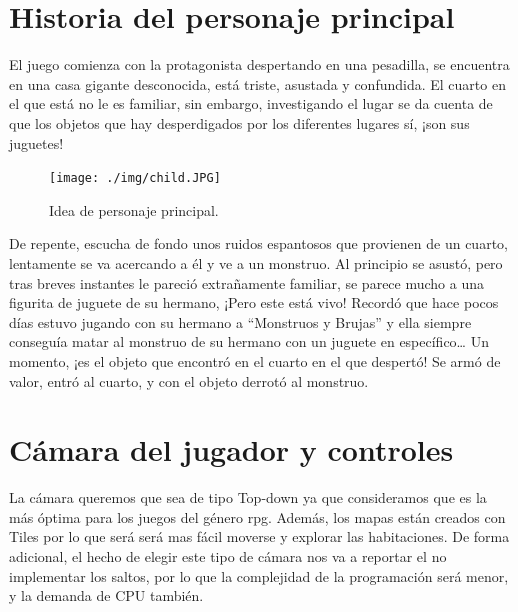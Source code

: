 \newpage

\section{Historia del personaje principal}

El juego comienza con la protagonista despertando en una pesadilla, se encuentra en una casa gigante desconocida, está triste, asustada y confundida. El cuarto en el que está no le es familiar, sin embargo, investigando el lugar se da cuenta de que los objetos que hay desperdigados por los diferentes lugares sí, ¡son sus juguetes!

\begin{figure}[!htb]
  \centering
    \texttt{[image: ./img/child.JPG]}
    \caption{Idea de personaje principal.}
  \label{fig:yo}
\end{figure}
\newline
De repente, escucha de fondo unos ruidos espantosos que provienen de un cuarto, lentamente se va acercando a él y ve a un monstruo. Al principio se asustó, pero tras breves instantes le pareció extrañamente familiar, se parece mucho a una figurita de juguete de su hermano, ¡Pero este está vivo! \newline
\newline
Recordó que hace pocos días estuvo jugando con su hermano a “Monstruos y Brujas” y ella siempre conseguía matar al monstruo de su hermano con un juguete en específico… \newline
\newline
Un momento, ¡es el objeto que encontró en el cuarto en el que despertó! Se armó de valor, entró al cuarto, y con el objeto derrotó al monstruo.

\section{Cámara del jugador y controles}

La cámara queremos que sea de tipo Top-down ya que consideramos que es la más óptima para los juegos del género rpg. Además, los mapas están creados con Tiles por lo que será será mas fácil moverse y explorar las habitaciones. De forma adicional, el hecho de elegir este tipo de cámara nos va a reportar el no implementar los saltos, por lo que la complejidad de la programación será menor, y la demanda de CPU también.
\newpage

